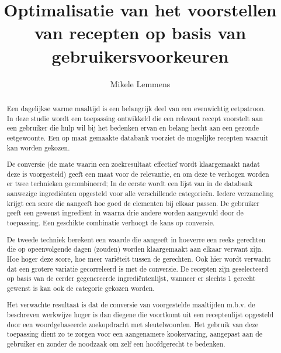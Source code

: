 \documentclass{hogent-article}
\title{Optimalisatie van het voorstellen van recepten op basis van gebruikersvoorkeuren}
\author{Mikele Lemmens}
\begin{document}
\begin{abstract}
    
Een dagelijkse warme maaltijd is een belangrijk deel van een evenwichtig eetpatroon. In deze studie wordt een toepassing ontwikkeld die een relevant recept voorstelt aan een gebruiker die hulp wil bij het bedenken ervan en belang hecht aan een gezonde eetgewoonte. Een op maat gemaakte databank voorziet de mogelijke recepten waaruit kan worden gekozen.

De conversie (de mate waarin een zoekresultaat effectief wordt klaargemaakt nadat deze is voorgesteld) geeft een maat voor de relevantie, en om deze te verhogen worden er twee technieken gecombineerd; In de eerste wordt een lijst van in de databank aanwezige ingrediënten opgesteld voor alle verschillende categorieën. Iedere verzameling krijgt een score die aangeeft hoe goed de elementen bij elkaar passen. De gebruiker geeft een gewenst ingrediënt in waarna drie andere worden aangevuld door de toepassing. Een geschikte combinatie verhoogt de kans op conversie.

De tweede techniek berekent een waarde die aangeeft in hoeverre een reeks gerechten die op opeenvolgende dagen (zouden) worden klaargemaakt aan elkaar verwant zijn. Hoe hoger deze score, hoe meer variëteit tussen de gerechten. Ook hier wordt verwacht dat een grotere variatie gecorreleerd is met de conversie. De recepten zijn geselecteerd op basis van de eerder gegenereerde ingrediëntenlijst, wanneer er slechts 1 gerecht gewenst is kan ook de categorie gekozen worden.

Het verwachte resultaat is dat de conversie van voorgestelde maaltijden m.b.v. de beschreven werkwijze hoger is dan diegene die voortkomt uit een receptenlijst opgesteld door een woordgebaseerde zoekopdracht met sleutelwoorden. Het gebruik van deze toepassing dient zo te zorgen voor een aangenamere kookervaring, aangepast aan de gebruiker en zonder de noodzaak om zelf een hoofdgerecht te bedenken.


\end{abstract}

\tableofcontents

\bigskip


\end{document}
